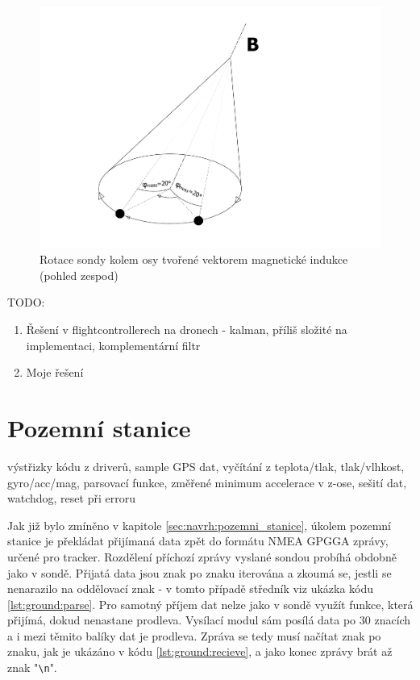\documentclass[twoside]{ctuthesis}
\theoremstyle{plain}
\theoremstyle{definition}
\theoremstyle{note}
\begin{document}
	\begin{figure}[hbtp]
		\centering
		\includegraphics[width=.5\textwidth]{Figures/sonda_naklon_mag_osova_rotace.pdf}
		\caption{Rotace sondy kolem osy tvořené vektorem magnetické indukce (pohled zespod)}
		\label{fig:sonda:mag:rot}
	\end{figure}
	


	
	
TODO:
	\begin{enumerate}
		\item Řešení v flightcontrollerech na dronech - kalman, příliš složité na implementaci, komplementární filtr
		\item Moje řešení
	\end{enumerate}
	









	

	







	\section{Pozemní stanice}
	výstřizky kódu z driverů, sample GPS dat, vyčítání z teplota/tlak, tlak/vlhkost, gyro/acc/mag, parsovací funkce, změřené minimum accelerace v z-ose, sešití dat, watchdog, reset při erroru

	Jak již bylo zmíněno v kapitole \ref{sec:navrh:pozemni_stanice}, úkolem pozemní stanice je překládat přijímaná data zpět do formátu NMEA GPGGA zprávy, určené pro tracker. Rozdělení příchozí zprávy vyslané sondou probíhá obdobně jako v sondě. Přijatá data jsou znak po znaku iterována a zkoumá se, jestli se nenarazilo na oddělovací znak - v tomto případě středník viz ukázka kódu \ref{lst:ground:parse}. Pro samotný příjem dat nelze jako v sondě využít funkce, která přijímá, dokud nenastane prodleva. Vysílací modul sám posílá data po 30 znacích a i mezi těmito balíky dat je prodleva. Zpráva se tedy musí načítat znak po znaku, jak je ukázáno v kódu \ref{lst:ground:recieve}, a jako konec zprávy brát až znak "\lstinline |\n|".
\end{document}
